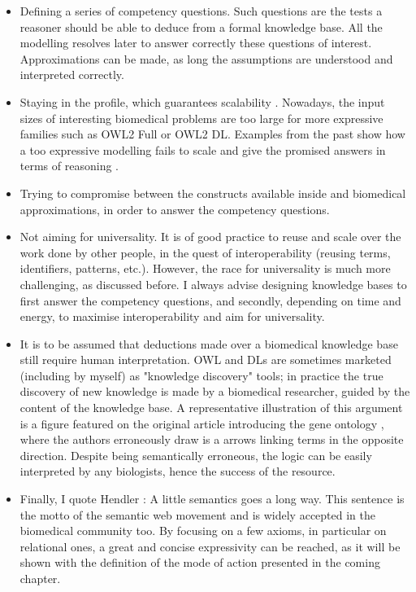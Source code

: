 \begin{itemize}
  \item Defining a series of competency questions. Such questions are the tests a reasoner should be able to deduce from a formal knowledge base. All the modelling resolves later to answer correctly these questions of interest. Approximations can be made, as long the assumptions are understood and interpreted correctly.
  \item Staying in the  profile, which guarantees scalability \citep{hoehndorf2011common}. Nowadays, the input sizes of interesting biomedical problems are too large for more expressive families such as OWL2 Full or OWL2 DL. Examples from the past show how a too expressive modelling fails to scale and give the promised answers in terms of reasoning \citep{vempati2012formalization} \citep{golbreich2006foundational} \citep{mungall2010integrating} \citep{mungall2011cross} \citep{villanueva2008yowl}.
  \item Trying to compromise between the constructs available inside  and biomedical approximations, in order to answer the competency questions.
  \item Not aiming for universality. It is of good practice to reuse and scale over the work done by other people, in the quest of interoperability (reusing terms, identifiers, patterns, etc.). However, the race for universality is much more challenging, as discussed before. I always advise designing knowledge bases to first answer the competency questions, and secondly, depending on time and energy, to maximise interoperability and aim for universality.
  \item It is to be assumed that deductions made over a biomedical knowledge base still require human interpretation. OWL and DLs are sometimes marketed (including by myself) as "knowledge discovery" tools; in practice the true discovery of new knowledge is made by a biomedical researcher, guided by the content of the knowledge base. A representative illustration of this argument is a figure featured on the original article introducing the gene ontology \citep{ashburner2000gene}, where the authors erroneously draw is a arrows linking terms in the opposite direction. Despite being semantically erroneous, the logic can be easily interpreted by any biologists, hence the success of the resource.
  \item Finally, I quote Hendler \citep{littlesemantics}: A little semantics goes a long way. This sentence is the motto of the semantic web movement and is widely accepted in the biomedical community too. By focusing on a few axioms, in particular on relational ones, a great and concise expressivity can be reached, as it will be shown with the definition of the mode of action presented in the coming chapter.
\end{itemize}

